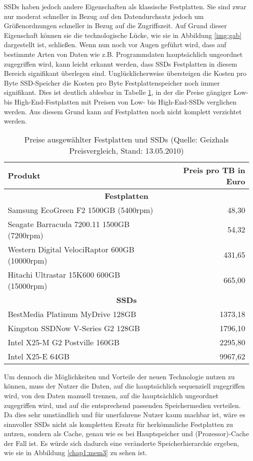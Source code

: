 \acp{SSD} haben jedoch andere Eigenschaften als klassische Festplatten. Sie sind zwar nur moderat schneller in Bezug auf den Datendurchsatz jedoch um
Größenordnungen schneller in Bezug auf die Zugriffszeit. Auf Grund dieser Eigenschaft können sie die technologische Lücke, wie sie in Abbildung \ref{img:gab}
dargestellt ist, schließen. Wenn nun noch vor Augen geführt wird, dass auf bestimmte Arten von Daten wie z.B. Programmdaten hauptsächlich ungeordnet
zugegriffen wird, kann leicht erkannt werden, dass \acp{SSD} Festplatten in diesem Bereich signifikant überlegen sind. Unglücklicherweise übersteigen die Kosten
pro Byte \ac{SSD}-Speicher die Kosten pro Byte Festplattenspeicher noch immer signifikant. Dies ist deutlich ablesbar in Tabelle \ref{chap1:preise}, in der
die Preise gängiger Low- bis High-End-Festplatten mit Preisen von Low- bis High-End-\acp{SSD} verglichen werden. Aus diesem Grund kann auf Festplatten noch
nicht komplett verzichtet werden.

\begin{table}[b]\centering
  \caption{Preise ausgewählter Festplatten und SSDs (Quelle: Geizhals Preisvergleich, Stand: 13.05.2010)} 
	\begin{tabular}{l|r}
	Produkt & Preis pro TB in Euro \\ \hline
	\multicolumn{2}{c}{\textbf{Festplatten}} \\ \hline
	Samsung EcoGreen F2 1500GB (5400rpm) & 48,30 \\ \hline
	Seagate Barracuda 7200.11 1500GB (7200rpm) & 54,32 \\ \hline
	Western Digital VelociRaptor 600GB (10000rpm) & 431,65 \\ \hline
	Hitachi Ultrastar 15K600 600GB (15000rpm) & 665,00 \\ \hline
	\multicolumn{2}{c}{\textbf{\acp{SSD}}} \\ \hline
	BestMedia Platinum MyDrive 128GB & 1373,18 \\ \hline
	Kingston SSDNow V-Series G2 128GB & 1796,10 \\ \hline
	Intel X25-M G2 Postville 160GB & 2295,80 \\ \hline
	Intel X25-E 64GB & 9967,62 \\  \hline
	\end{tabular}
	\label{chap1:preise}
\end{table}

\newpage

Um dennoch die Möglichkeiten und Vorteile der neuen Technologie nutzen zu können, muss der Nutzer die Daten, auf die hauptsächlich sequenziell
zugegriffen wird, von den Daten manuell trennen, auf die hauptsächlich ungeordnet zugegriffen wird, und auf die entsprechend passenden Speichermedien verteilen.
Da dies sehr umständlich und für unerfahrene Nutzer kaum machbar ist, wäre es sinnvoller \acp{SSD} nicht als kompletten Ersatz für herkömmliche Festplatten zu
nutzen, sondern als Cache, genau wie es bei Hauptspeicher und (Prozessor)-Cache der Fall ist. Es würde sich dadurch eine veränderte Speicherhierarchie
ergeben, wie sie in Abbildung \ref{chap1:mem3} zu sehen ist.

